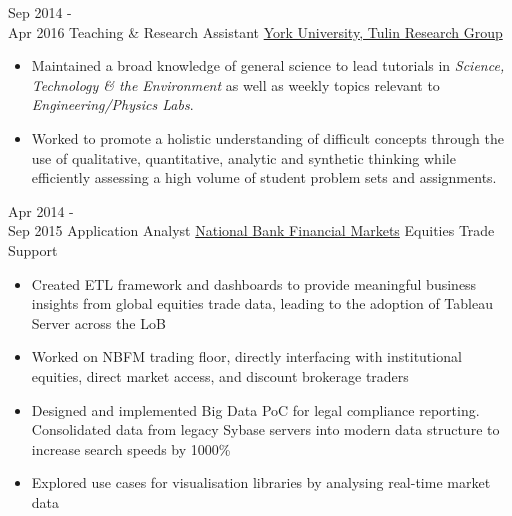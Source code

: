 \documentclass[letterpaper]{twentysecondcv} %
\begin{document}
\begin{twenty}
     \twentyitem
   		{Sep 2014 - \\ Apr 2016}
        {Teaching \& Research Assistant}
        {\href{http://www.yorku.ca/}{York University, Tulin Research Group}}
        {}
        {}
        {
        \begin{itemize}
        \item Maintained a broad knowledge of general science to lead tutorials in \emph{Science, Technology \& the Environment} as well as  weekly topics relevant to \emph{Engineering/Physics Labs}.
        \item Worked to promote a holistic understanding of difficult concepts through the use of qualitative, quantitative, analytic and synthetic thinking while efficiently assessing a high volume of student problem sets and assignments.
	    \end{itemize}
    	}


     \twentyitem
   		{Apr 2014 - \\ Sep 2015}
        {Application Analyst}
        {\href{http://nbfm.ca/}{National Bank Financial Markets}}
        {Equities Trade Support}
        {	\item{}
			\item{}
			\item
			\item			
			\item{}
			\item
			\item{}
			\item{}
        }
        {
        \begin{itemize}
        \item Created ETL framework and dashboards to provide meaningful business insights from global equities trade data, leading to the adoption of Tableau Server across the LoB
        \item Worked on NBFM trading floor, directly interfacing with institutional equities, direct market access, and discount brokerage traders
        \item Designed and implemented Big Data PoC for legal compliance reporting. Consolidated data from legacy Sybase servers into modern data structure to increase search speeds by 1000\% 
        \item Explored use cases for visualisation libraries by analysing real-time market data
	    \end{itemize}
    	}
        
\end{twenty}
\end{document}
